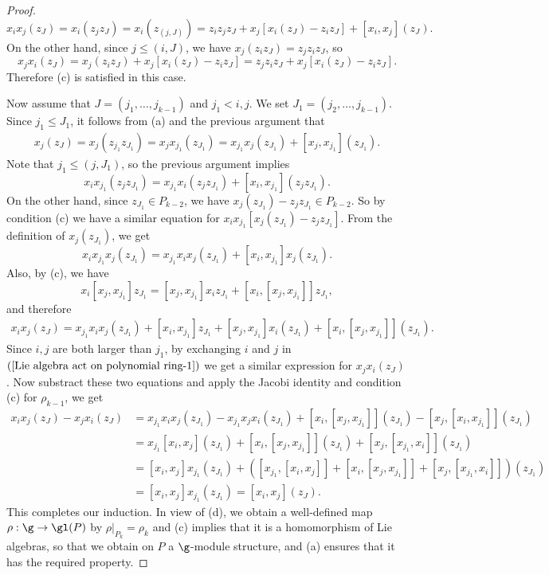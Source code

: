 \begin{proof}
\begin{equation*}
x_ix_j(z_J)=x_i(z_jz_J)=x_i(z_{(j,J)})=z_iz_jz_J+x_j[x_i(z_J)-z_iz_J]+[x_i,x_j](z_J).
\end{equation*}
On the other hand, since $j\leq(i,J)$, we have $x_j(z_iz_J)=z_jz_iz_J$, so
\begin{equation*}
x_jx_i(z_J)=x_j(z_iz_J)+x_j[x_i(z_J)-z_iz_J]=z_jz_iz_J+x_j[x_i(z_J)-z_iz_J].
\end{equation*}
Therefore (c) is satisfied in this case.\par
Now assume that $J=(j_1,\dots,j_{k-1})$ and $j_1<i,j$. We set $J_1=(j_2,\dots,j_{k-1})$. Since $j_1\leq J_1$, it follows from (a) and the previous argument that
\begin{align*}
x_j(z_J)=x_j(z_{j_1}z_{J_1})=x_jx_{j_1}(z_{J_1})=x_{j_1}x_j(z_{J_1})+[x_j,x_{j_1}](z_{J_1}).
\end{align*}
Note that $j_1\leq(j,J_1)$, so the previous argument implies
\[x_ix_{j_1}(z_jz_{J_1})=x_{j_1}x_i(z_jz_{J_1})+[x_i,x_{j_1}](z_jz_{J_1}).\]
On the other hand, since $z_{J_1}\in P_{k-2}$, we have $x_j(z_{J_1})-z_jz_{J_1}\in P_{k-2}$. So by condition (c) we have a similar equation for $x_ix_{j_1}[x_j(z_{J_1})-z_jz_{J_1}]$. From the definition of $x_j(z_{J_1})$, we get
\[x_ix_{j_1}x_j(z_{J_1})=x_{j_1}x_ix_j(z_{J_1})+[x_i,x_{j_1}]x_j(z_{J_1}).\]
Also, by (c), we have
\[x_i[x_j,x_{j_1}]z_{J_1}=[x_j,x_{j_1}]x_iz_{J_1}+[x_i,[x_j,x_{j_1}]]z_{J_1},\]
and therefore
\begin{equation}\label{Lie algebra act on polynomial ring-1}
\begin{aligned}
x_ix_j(z_J)=x_{j_1}x_ix_j(z_{J_1})+[x_i,x_{j_1}]z_{J_1}+[x_j,x_{j_1}]x_i(z_{J_1})+[x_i,[x_j,x_{j_1}]](z_{J_1}).
\end{aligned}
\end{equation}
Since $i,j$ are both larger than $j_1$, by exchanging $i$ and $j$ in $(\ref{Lie algebra act on polynomial ring-1})$ we get a similar expression for $x_jx_i(z_J)$. Now substract these two equations and apply the Jacobi identity and condition (c) for $\rho_{k-1}$, we get
\begin{align*}
x_ix_j(z_J)-x_jx_i(z_J)&=x_{j_1}x_ix_j(z_{J_1})-x_{j_1}x_jx_i(z_{J_1})+[x_i,[x_j,x_{j_1}]](z_{J_1})-[x_j,[x_i,x_{j_1}]](z_{J_1})\\
&=x_{j_1}[x_i,x_j](z_{J_1})+[x_i,[x_j,x_{j_1}]](z_{J_1})+[x_j,[x_{j_1},x_{i}]](z_{J_1})\\
&=[x_i,x_j]x_{j_1}(z_{J_1})+([x_{j_1},[x_i,x_j]]+[x_i,[x_j,x_{j_1}]]+[x_j,[x_{j_1},x_{i}]])(z_{J_1})\\
&=[x_i,x_j]x_{j_1}(z_{J_1})=[x_i,x_j](z_J).
\end{align*}
This completes our induction. In view of (d), we obtain a well-defined map $\rho:\g\to\gl(P)$ by $\rho|_{P_k}=\rho_k$ and (c) implies that it is a homomorphism of Lie algebras, so that we obtain on $P$ a $\g$-module structure, and (a) ensures that it has the required property.
\end{proof}
